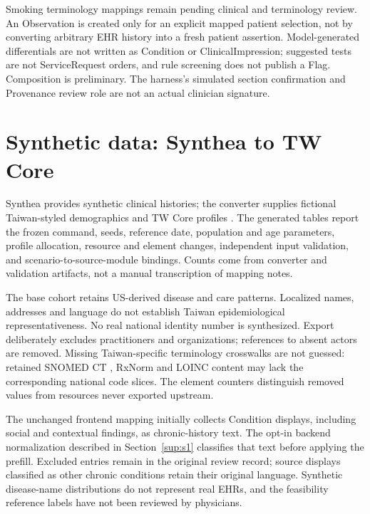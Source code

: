 Smoking terminology mappings remain pending clinical and terminology review.
An Observation is created only for an explicit mapped patient selection, not by
converting arbitrary EHR history into a fresh patient assertion. Model-generated
differentials are not written as Condition or ClinicalImpression; suggested tests
are not ServiceRequest orders, and rule screening does not publish a Flag.
Composition is preliminary. The harness's simulated section confirmation and
Provenance review role are not an actual clinician signature.

\section{Synthetic data: Synthea to TW Core}\label{sup:s3}
Synthea provides synthetic clinical histories; the converter supplies fictional
Taiwan-styled demographics and TW Core profiles \citep{syntheaMethod,syntheaSoftware,twcoreIG}.
The generated tables report the frozen command, seeds, reference date, population
and age parameters, profile allocation, resource and element changes, independent
input validation, and scenario-to-source-module bindings. Counts come from converter
and validation artifacts, not a manual transcription of mapping notes.


The base cohort retains US-derived disease and care patterns. Localized names,
addresses and language do not establish Taiwan epidemiological representativeness.
No real national identity number is synthesized. Export deliberately excludes
practitioners and organizations; references to absent actors are removed. Missing
Taiwan-specific terminology crosswalks are not guessed: retained SNOMED CT
\citep{snomedCt}, RxNorm \citep{nelsonRxNorm2011} and LOINC \citep{mcdonaldLoinc2003}
content may lack the corresponding national code slices. The element
counters distinguish removed values from resources never exported upstream.

The unchanged frontend mapping initially collects Condition displays, including
social and contextual findings, as chronic-history text. The opt-in backend
normalization described in Section~\ref{sup:s1} classifies that text before
applying the prefill. Excluded entries remain in the original review record;
source displays classified as other chronic conditions retain their original
language. Synthetic disease-name distributions do not represent real EHRs,
and the feasibility reference labels have not been reviewed by physicians.

